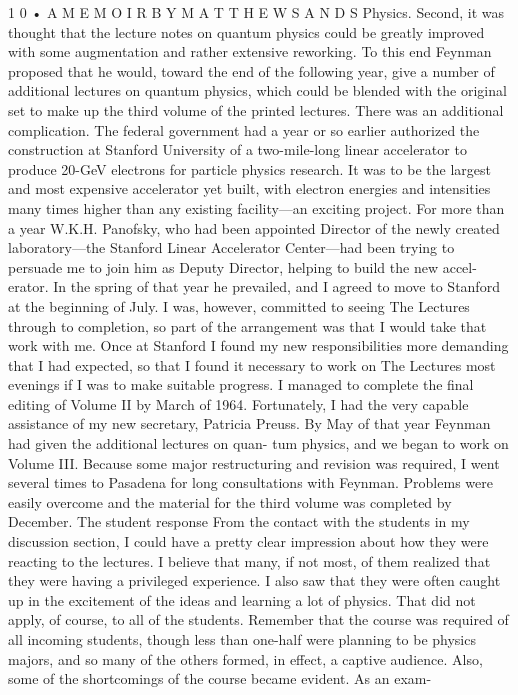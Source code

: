 \documentclass[10pt,oneside]{article}
\begin{document}
1 0 • A  M E M O I R  B Y  M A T T H E W  S A N D S Physics. Second, it was thought that the lecture notes on quantum physics could be greatly improved with some augmentation and rather extensive reworking. To this end Feynman proposed that he would, toward the end of the following year, give a number of additional lectures on quantum physics, which could be blended with the original set to make up the third volume of the printed lectures. There was an additional complication. The federal government had a year or so earlier authorized the construction at Stanford University of a two-mile-long linear accelerator to produce 20-GeV electrons for particle physics research. It was to be the largest and most expensive accelerator yet built, with electron energies and intensities many times higher than any existing facility---an exciting project. For more than a year W.K.H. Panofsky, who had been appointed Director of the newly created laboratory---the Stanford Linear Accelerator Center---had been trying to persuade me to join him as Deputy Director, helping to build the new accel- erator. In the spring of that year he prevailed, and I agreed to move to Stanford at the beginning of July. I was, however, committed to seeing The Lectures through to completion, so part of the arrangement was that I would take that work with me. Once at Stanford I found my new responsibilities more demanding that I had expected, so that I found it necessary to work on The Lectures most evenings if I was to make suitable progress. I managed to complete the final editing of Volume II by March of 1964. Fortunately, I had the very capable assistance of my new secretary, Patricia Preuss. By May of that year Feynman had given the additional lectures on quan- tum physics, and we began to work on Volume III. Because some major restructuring and revision was required, I went several times to Pasadena for long consultations with Feynman. Problems were easily overcome and the material for the third volume was completed by December. The student response From the contact with the students in my discussion section, I could have a pretty clear impression about how they were reacting to the lectures. I believe that many, if not most, of them realized that they were having a privileged experience. I also saw that they were often caught up in the excitement of the ideas and learning a lot of physics. That did not apply, of course, to all of the students. Remember that the course was required of all incoming students, though less than one-half were planning to be physics majors, and so many of the others formed, in effect, a captive audience. Also, some of the shortcomings of the course became evident. As an exam-\par
\end{document}
